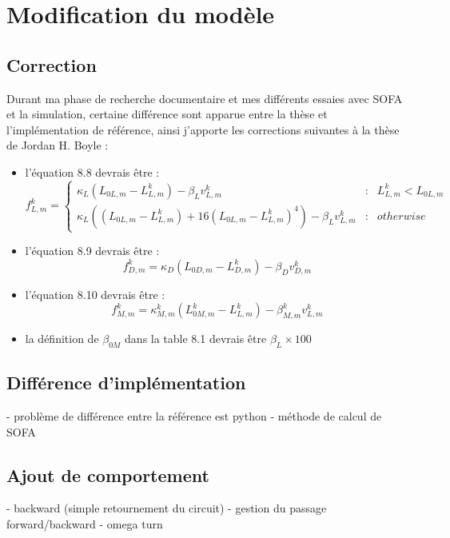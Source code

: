 \chapter{Modification du modèle} %
\label{cha:Modification du modèle}

\section{Correction} %
\label{sec:Correction}

Durant ma phase de recherche documentaire et mes différents essaies avec
SOFA et la simulation, certaine différence sont apparue entre la thèse
et l'implémentation de référence, ainsi j'apporte les corrections suivantes
à la thèse de Jordan H. Boyle \cite{Boyle2009} :
\begin{itemize}
   \item l'équation 8.8 devrais être :
      $$
      f^k_{L,m} = \left\{ 
         \begin{array}{rcl}
            \kappa_L(L_{0L,m} - L_{L,m}^k) - \beta_{L}v_{L,m}^k & : & L_{L,m}^k < L_{0L,m}\\
            \kappa_L((L_{0L,m} - L_{L,m}^k) + 16(L_{0L,m} - L_{L,m}^k)^4) - \beta_{L}v_{L,m}^k & : & otherwise
         \end{array}
         \right.
      $$
   \item l'équation 8.9 devrais être :
      $$
      f_{D,m}^k = \kappa_D(L_{0D,m} - L_{D,m}^k) - \beta_{D}v_{D,m}^k
      $$
   \item l'équation 8.10 devrais être :
      $$
      f_{M,m}^k = \kappa_{M,m}^k(L_{0M,m}^k - L_{L,m}^k) - \beta_{M,m}^{k}v_{L,m}^k
      $$
   \item la définition de $\beta_{0M}$ dans la table 8.1 devrais être $\beta_L \times 100$
\end{itemize}


\section{Différence d'implémentation} %
\label{sec:Différence d'implémentation}

- problème de différence entre la référence est python
- méthode de calcul de SOFA


\section{Ajout de comportement} %
\label{sec:Ajout de comportement}

- backward (simple retournement du circuit)
  - gestion du passage forward/backward
- omega turn


